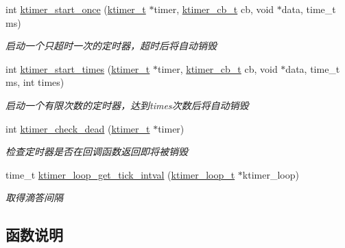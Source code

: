\begin{DoxyCompactItemize}
int \hyperlink{a00108_ga9c37409260a72e3218ae4fcaf44d79bc_ga9c37409260a72e3218ae4fcaf44d79bc}{ktimer\+\_\+start\+\_\+once} (\hyperlink{a00050_a846172ea4e8a86449eca41a3d8e074b7_a846172ea4e8a86449eca41a3d8e074b7}{ktimer\+\_\+t} $\ast$timer, \hyperlink{a00050_a2333fd0f2c3a85faf586300ca40deed4_a2333fd0f2c3a85faf586300ca40deed4}{ktimer\+\_\+cb\+\_\+t} cb, void $\ast$data, time\+\_\+t ms)
\begin{DoxyCompactList}\small\item\em 启动一个只超时一次的定时器，超时后将自动销毁 \end{DoxyCompactList}\item 
int \hyperlink{a00108_ga285936846760d9f325e588d2e2105fe5_ga285936846760d9f325e588d2e2105fe5}{ktimer\+\_\+start\+\_\+times} (\hyperlink{a00050_a846172ea4e8a86449eca41a3d8e074b7_a846172ea4e8a86449eca41a3d8e074b7}{ktimer\+\_\+t} $\ast$timer, \hyperlink{a00050_a2333fd0f2c3a85faf586300ca40deed4_a2333fd0f2c3a85faf586300ca40deed4}{ktimer\+\_\+cb\+\_\+t} cb, void $\ast$data, time\+\_\+t ms, int times)
\begin{DoxyCompactList}\small\item\em 启动一个有限次数的定时器，达到times次数后将自动销毁 \end{DoxyCompactList}\item 
int \hyperlink{a00108_ga9387b99ff760183fe8b61c8c46d6efc8_ga9387b99ff760183fe8b61c8c46d6efc8}{ktimer\+\_\+check\+\_\+dead} (\hyperlink{a00050_a846172ea4e8a86449eca41a3d8e074b7_a846172ea4e8a86449eca41a3d8e074b7}{ktimer\+\_\+t} $\ast$timer)
\begin{DoxyCompactList}\small\item\em 检查定时器是否在回调函数返回即将被销毁 \end{DoxyCompactList}\item 
time\+\_\+t \hyperlink{a00108_ga71282c2dc8bac0935617b1271f4066e6_ga71282c2dc8bac0935617b1271f4066e6}{ktimer\+\_\+loop\+\_\+get\+\_\+tick\+\_\+intval} (\hyperlink{a00050_a024af2aa29615e7a811ea6c45438157d_a024af2aa29615e7a811ea6c45438157d}{ktimer\+\_\+loop\+\_\+t} $\ast$ktimer\+\_\+loop)
\begin{DoxyCompactList}\small\item\em 取得滴答间隔 \end{DoxyCompactList}\end{DoxyCompactItemize}


\subsection{函数说明}
\hypertarget{a00108_ga9387b99ff760183fe8b61c8c46d6efc8_ga9387b99ff760183fe8b61c8c46d6efc8}{}
